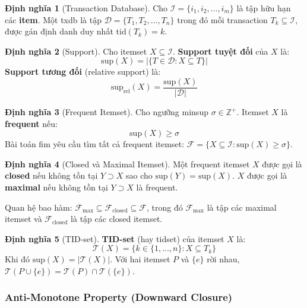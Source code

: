 \documentclass[12pt,a4paper]{article}
\newcommand{\supp}{\mathrm{sup}}
\theoremstyle{definition}
\newtheorem{definition}{Định nghĩa}[section]
\begin{document}
\begin{definition}[Transaction Database]
Cho $\mathcal{I} = \{i_1, i_2, \ldots, i_m\}$ là tập hữu hạn các \textbf{item}. Một \gls{txdb} là tập $\mathcal{D} = \{T_1, T_2, \ldots, T_n\}$ trong đó mỗi transaction $T_k \subseteq \mathcal{I}$, được gán định danh duy nhất $\mathrm{tid}(T_k) = k$.
\end{definition}

\begin{definition}[Support]
Cho \gls{itemset} $X \subseteq \mathcal{I}$. \textbf{Support tuyệt đối} của $X$ là:
\[
    \supp(X) = \bigl|\{T \in \mathcal{D} : X \subseteq T\}\bigr|
\]
\textbf{Support tương đối} (relative support) là:
\[
    \supp_{\mathrm{rel}}(X) = \frac{\supp(X)}{|\mathcal{D}|}
\]
\end{definition}

\begin{definition}[Frequent Itemset]
Cho ngưỡng \gls{minsup} $\sigma \in \mathbb{Z}^{+}$. Itemset $X$ là \textbf{frequent} nếu:
\[
    \supp(X) \geq \sigma
\]
Bài toán \gls{fim} yêu cầu tìm tất cả frequent itemset: $\mathcal{F} = \{X \subseteq \mathcal{I} : \supp(X) \geq \sigma\}$.
\end{definition}

\begin{definition}[Closed và Maximal Itemset]
Một frequent itemset $X$ được gọi là \textbf{\gls{closed}} nếu không tồn tại $Y \supset X$ sao cho $\supp(Y) = \supp(X)$. $X$ được gọi là \textbf{\gls{maximal}} nếu không tồn tại $Y \supset X$ là frequent.

Quan hệ bao hàm: $\mathcal{F}_{\max} \subseteq \mathcal{F}_{\mathrm{closed}} \subseteq \mathcal{F}$, trong đó $\mathcal{F}_{\max}$ là tập các maximal itemset và $\mathcal{F}_{\mathrm{closed}}$ là tập các closed itemset.
\end{definition}

\begin{definition}[TID-set]
\textbf{TID-set} (hay tidset) của itemset $X$ là:
\[
    \mathcal{T}(X) = \{k \in \{1,\ldots,n\} : X \subseteq T_k\}
\]
Khi đó $\supp(X) = |\mathcal{T}(X)|$. Với hai itemset $P$ và $\{e\}$ rời nhau, $\mathcal{T}(P \cup \{e\}) = \mathcal{T}(P) \cap \mathcal{T}(\{e\})$.
\end{definition}

\subsubsection{Anti-Monotone Property (Downward Closure)}
\end{document}
